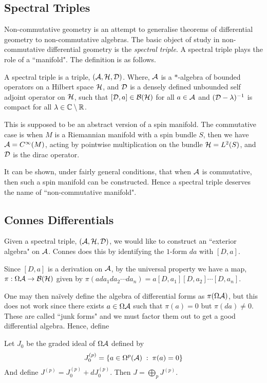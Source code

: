 \documentclass{owmaths}
\begin{document}
\subsection{Spectral Triples}
Non-commutative geometry is an attempt to generalise theorems of differential geometry
to non-commutative algebras. The basic object of study in non-commutative differential
geometry is the \emph{spectral triple}. A spectral triple plays the role of a 
``manifold". The definition is as follows.
\begin{definition}
    A spectral triple is a triple, $(\mathcal{A},\mathcal{H},\mathcal{D})$. Where,
    $\mathcal{A}$ is a $*$-algebra of bounded operators on a Hilbert space $\mathcal{H}$, and
    $\mathcal{D}$ is a densely defined unbounded self adjoint operator on $\mathcal{H}$, such
    that $[\mathcal{D},a] \in \mathcal{B}(\mathcal{H})$ for all $a \in \mathcal{A}$ and $(\mathcal{D}-\lambda)^{-1}$
    is compact for all $\lambda \in \mathbb{C}\setminus \mathbb{R}$.
\end{definition}

This is supposed to be an abstract version of a spin manifold. The commutative case
is when $M$ is a Riemannian manifold with a spin bundle $S$, then we have $\mathcal{A} = C^\infty(M)$,
acting by pointwise multiplication on the bundle $\mathcal{H} = L^2(S)$, and $\mathcal{D}$
is the dirac operator.

It can be shown, under fairly general conditions, that when $\mathcal{A}$ is commutative, then 
such a spin manifold can be constructed. Hence a spectral triple deserves
the name of ``non-commutative manifold".
\subsection{Connes Differentials}
Given a spectral triple, $(\mathcal{A},\mathcal{H},\mathcal{D})$, we would like to construct an ``exterior algebra"
on $\mathcal{A}$. Connes does this by identifying the $1$-form $da$ with $[D,a]$.

Since $[D,a]$ is a derivation on $\mathcal{A}$, by the universal property we have a map, $\pi:\Omega\mathcal{A}\rightarrow \mathcal{B}(\mathcal{H})$
given by $\pi(ada_1da_2\cdots da_n) = a[D,a_1][D,a_2]\cdots[D,a_n]$.

One may then na\"ively define the algebra of differential forms as $\pi(\Omega \mathcal{A})$,
but this does not work since there exists $a \in \Omega \mathcal{A}$ such that $\pi(a) = 0$
but $\pi(da) \neq 0$. These are called ``junk forms" and we must factor them out to get
a good differential algebra. Hence, define
\begin{theorem}
    Let $J_0$ be the graded ideal of $\Omega \mathcal{A}$ defined by 
    \begin{equation*}
        J_0^{(p)} = \{a \in \Omega^p(\mathcal{A}) \;:\; \pi(a) = 0\}
    \end{equation*}
    And define $J^{(p)} = J_0^{(p)} + dJ_0^{(p)}$. Then $J = \bigoplus_p J^{(p)}$.
\end{theorem}
\end{document}
